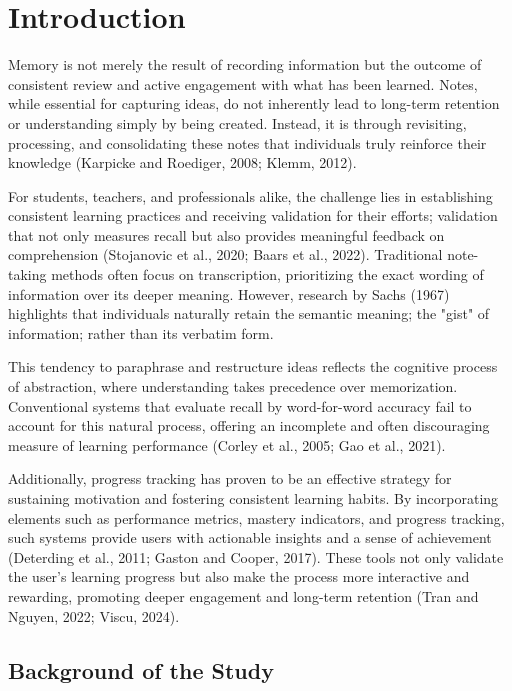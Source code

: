 \chapter{Introduction}
\label{chap:introduction}

Memory is not merely the result of recording information but the outcome of consistent review and active engagement with what has been learned. Notes, while essential for capturing ideas, do not inherently lead to long-term retention or understanding simply by being created. Instead, it is through revisiting, processing, and consolidating these notes that individuals truly reinforce their knowledge (Karpicke and Roediger, 2008; Klemm, 2012). 

For students, teachers, and professionals alike, the challenge lies in establishing consistent learning practices and receiving validation for their efforts; validation that not only measures recall but also provides meaningful feedback on comprehension (Stojanovic et al., 2020; Baars et al., 2022). Traditional note-taking methods often focus on transcription, prioritizing the exact wording of information over its deeper meaning. However, research by Sachs (1967) highlights that individuals naturally retain the semantic meaning; the "gist" of information; rather than its verbatim form.

This tendency to paraphrase and restructure ideas reflects the cognitive process of abstraction, where understanding takes precedence over memorization. Conventional systems that evaluate recall by word-for-word accuracy fail to account for this natural process, offering an incomplete and often discouraging measure of learning performance (Corley et al., 2005; Gao et al., 2021). 

Additionally, progress tracking has proven to be an effective strategy for sustaining motivation and fostering consistent learning habits. By incorporating elements such as performance metrics, mastery indicators, and progress tracking, such systems provide users with actionable insights and a sense of achievement (Deterding et al., 2011; Gaston and Cooper, 2017). These tools not only validate the user’s learning progress but also make the process more interactive and rewarding, promoting deeper engagement and long-term retention (Tran and Nguyen, 2022; Viscu, 2024).

\section{Background of the Study}

